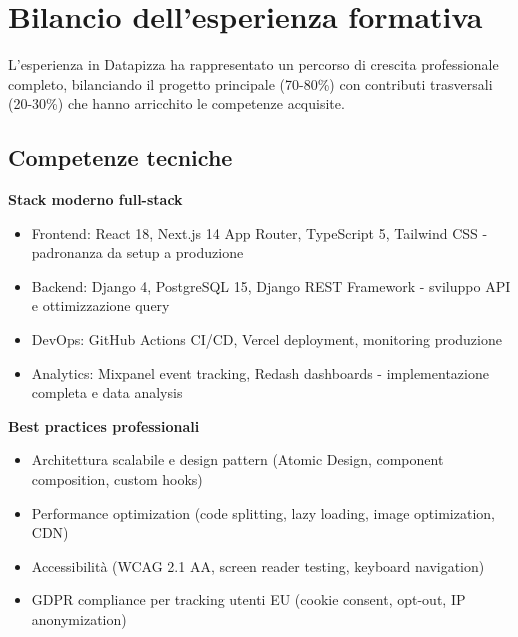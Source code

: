 \section{Bilancio dell'esperienza formativa}
L'esperienza in Datapizza ha rappresentato un percorso di crescita 
professionale completo, bilanciando il progetto principale (70-80\%) 
con contributi trasversali (20-30\%) che hanno arricchito le competenze 
acquisite.

\subsection{Competenze tecniche}
\textbf{Stack moderno full-stack}
\begin{itemize}
  \item Frontend: React 18, Next.js 14 App Router, TypeScript 5, 
        Tailwind CSS - padronanza da setup a produzione
  \item Backend: Django 4, PostgreSQL 15, Django REST Framework - 
        sviluppo API e ottimizzazione query
  \item DevOps: GitHub Actions CI/CD, Vercel deployment, monitoring 
        produzione
  \item Analytics: Mixpanel event tracking, Redash dashboards - 
        implementazione completa e data analysis
\end{itemize}

\textbf{Best practices professionali}
\begin{itemize}
  \item Architettura scalabile e design pattern (Atomic Design, 
        component composition, custom hooks)
  \item Performance optimization (code splitting, lazy loading, image 
        optimization, CDN)
  \item Accessibilità (WCAG 2.1 AA, screen reader testing, keyboard 
        navigation)
  \item GDPR compliance per tracking utenti EU (cookie consent, 
        opt-out, IP anonymization)
\end{itemize}

